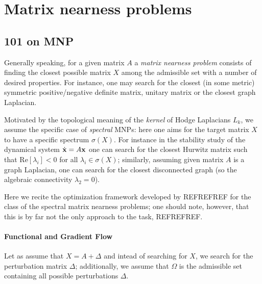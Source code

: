 \section{Matrix nearness problems}



\subsection{ 101 on MNP }

Generally speaking, for a given matrix \( A \) a \emph{matrix nearness problem} consists of finding the closest possible matrix \( X \) among the admissible set with a number of desired properties. For instance, one may search for the closest (in some metric) symmetric positive/negative definite matrix, unitary matrix or the closest graph Laplacian. 

Motivated by the topological meaning of the \emph{kernel} of Hodge Laplacians \( L_k \), we assume the specific case of \emph{spectral} MNPs: here one aims for the target matrix \( X \) to have a specific spectrum \( \sigma(X) \). For instance in the stability study of the dynamical system \( \dot{\mathbf{x}} = A \mathbf{x} \) one can search for the closest Hurwitz matrix such that \( \mathrm{Re} \left[ \lambda_i \right] < 0 \) for all \( \lambda_i \in \sigma(X) \); similarly, assuming given matrix \( A \) is a graph Laplacian, one can search for the closest disconnected graph (so the algebraic connectivity \( \lambda_2 = 0 \)).

Here we recite the optimization framework developed by REFREFREF for the class of the spectral matrix nearness problems; one should note, however, that this is by far not the only approach to the task, REFREFREF.

\paragraph{Functional and Gradient Flow}

Let as assume that \( X = A + \Delta \) and intead of searching for \( X \), we search for the perturbation matrix \( \Delta \); additionally, we assume that \( \Omega \) is the admissible set containing all possible perturbations \( \Delta \).
















